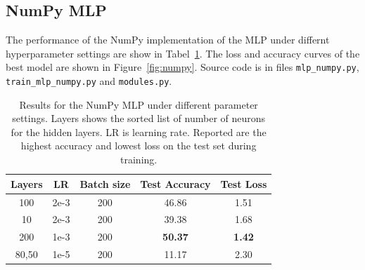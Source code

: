 \documentclass{article}
\newcommand\·{\ensuremath{\cdot}}
\newcommand\…{\ensuremath{\dots}}
\newcommand{\⇔}{\ensuremath{\Leftrightarrow}}
\newcommand{\⇐}{\ensuremath{\Leftarrow}}
\newcommand{\⇒}{\ensuremath{\Rightarrow}}
\newcommand\1{\ensuremath{\mathds{1}}}
\newcommand\ℝ{\ensuremath{\mathds{R}}}
\begin{document}
\subsection{NumPy MLP}
The performance of the NumPy implementation of the MLP under differnt hyperparameter settings are show in Tabel~\ref{tab:numpy}.
The loss and accuracy curves of the best model are shown in Figure~\ref{fig:numpy}.
Source code is in files \texttt{mlp\_numpy.py}, \texttt{train\_mlp\_numpy.py} and \texttt{modules.py}.

\begin{table}
  \centering
  \begin{tabular}{ccccc}
    Layers & LR & Batch size & Test Accuracy & Test Loss\\\toprule
    100 & 2e-3 & 200 & 46.86 & 1.51\\
    10 & 2e-3 & 200 & 39.38 & 1.68\\
    200 & 1e-3 & 200 & \textbf{50.37} & \textbf{1.42}\\
    80,50 & 1e-5 & 200 & 11.17 & 2.30\\
  \end{tabular}
  \caption{Results for the NumPy MLP under different parameter settings. Layers shows the sorted list of number of neurons for the hidden layers. LR is learning rate. Reported are the highest accuracy and lowest loss on the test set during training.}
  \label{tab:numpy}
\end{table}
\end{document}
